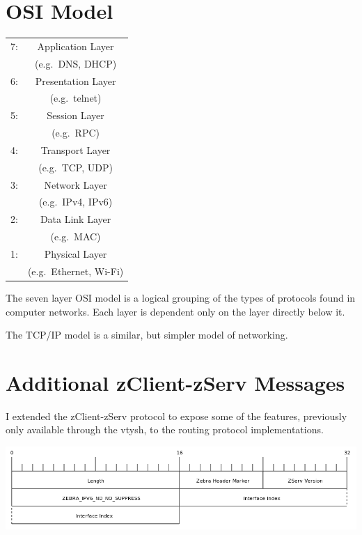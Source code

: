 \appendix 
\chapter{OSI Model}
\label{osi}
  \begin{center}
  \begin{tabular}{|lc|}
  \hline
  7: &
  Application Layer \\
  & (e.g.\ DNS, DHCP) \\
  \hline
  6: &
  Presentation Layer \\
  & (e.g.\ telnet) \\ 
  \hline
  5: &
  Session Layer \\
  & (e.g.\ RPC) \\
  \hline
  4: &
  Transport Layer \\
  & (e.g.\ TCP, UDP) \\
  \hline
  3: &
  Network Layer \\
  & (e.g.\ IPv4, IPv6) \\
  \hline  
  2: &
  Data Link Layer \\
  & (e.g.\ MAC) \\ 
  \hline  
  1: &
  Physical Layer \\
  & (e.g.\ Ethernet, Wi-Fi) \\
  \hline
\end{tabular}
\end{center}

The seven layer OSI model is a logical grouping of the types of protocols found
in computer networks. Each layer is dependent only on the layer directly below
it. 

The TCP/IP model is a similar, but simpler model of networking.

\chapter{Additional zClient-zServ Messages}
\label{zClient}
I extended the zClient-zServ protocol to expose some of the features,
previously only available through the vtysh, to the routing protocol
implementations. 

\begin{center}
	\includegraphics[width=0.9\linewidth]{../Diagrams/Packets/nd_no_suppress.png}
\end{center}

